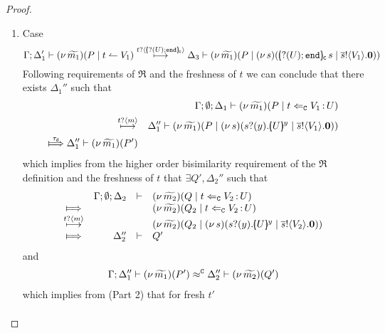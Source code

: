 \begin{proof}
\begin{enumerate}
\begin{enumerate}
					\item	%
						Case
						\[
							\horel{\Gamma}{\Delta_1'}{\newsp{\widetilde{m_1}}{P \Par \ntrigger{t}{V_1}}}
							{\hby{\bactinp{t}{\omapchar{\btinp{U} \tinact}}}}
							{\Delta_3}{\newsp{\widetilde{m_1}}{P \Par \newsp{s}{ \appl{\omapchar{\btinp{U} \tinact}}{s} \Par \bout{\dual{s}}{V_1} \inact}}}
						\]
							Following requirements of $\Re$ and the freshness of $t$
							we can conclude that there exists $\Delta_1''$ such that
						\begin{eqnarray*}
							&& \Gamma; \es; \Delta_1 \proves \newsp{\widetilde{m_1}}{P \Par \ftrigger{t}{V_1}{U}}\\
							\hby{\bactinp{t}{m}} &&
							\Delta_1'' \proves \newsp{\widetilde{m_1}}{P \Par \newsp{s}{\binp{s}{y} \mapchar{U}{y} \Par \bout{\dual{s}}{V_1} \inact}}\\
							\Hby{\dtau}
							\Delta_1'' \proves \newsp{\widetilde{m_1}}{P'}
						\end{eqnarray*}
							which implies from the higher order bisimilarity requirement of the $\Re$ definition and
							the freshness of $t$ that $\exists Q', \Delta_2''$ such that
							\begin{eqnarray}
								\begin{array}{crll}
									& \Gamma; \es; \Delta_2 & \proves &		
									\newsp{\widetilde{m_2}}{Q \Par \ftrigger{t}{V_2}{U}}
									\\
									\Hby{} &&&
									\newsp{\widetilde{m_2}}{Q_2 \Par \ftrigger{t}{V_2}{U}}
									\\
									{\hby{\bactinp{t}{m}}}& & &
									\newsp{\widetilde{m_2}}{Q_2 \Par \newsp{s}{\binp{s}{y} \mapchar{U}{y} \Par \bout{\dual{s}}{V_2} \inact}}
									\\
									\Hby{} & \Delta_2'' & \proves & Q'
								\end{array}
								\label{proof:trig_equiv2}
							\end{eqnarray}
							and
							\begin{eqnarray*}
								\Gamma; \Delta_1'' \vdash (\nu\, \widetilde{m_1})(P') \approx^\mathtt{C} \Delta_2'' \vdash (\nu\, \widetilde{m_2})(Q')
							\end{eqnarray*}
							which implies from  (Part 2) that
							for fresh $t'$
							\begin{eqnarray*}

\end{eqnarray*}
\end{enumerate}
\end{enumerate}
\end{proof}

